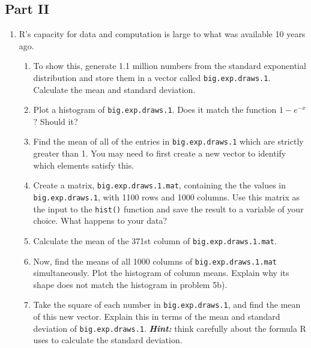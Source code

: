 \documentclass[
]{article}
\providecommand{\tightlist}{%
  \setlength{\itemsep}{0pt}\setlength{\parskip}{0pt}}
\begin{document}
\hypertarget{part-ii}{%
\subsection{Part II}\label{part-ii}}

\begin{enumerate}
\def\labelenumi{\arabic{enumi}.}
\setcounter{enumi}{4}
\tightlist
\item
  R's capacity for data and computation is large to what was available
  10 years ago.

  \begin{enumerate}
  \def\labelenumii{\alph{enumii}.}
  \tightlist
  \item
    To show this, generate 1.1 million numbers from the standard
    exponential distribution and store them in a vector called
    \texttt{big.exp.draws.1}. Calculate the mean and standard deviation.
  \item
    Plot a histogram of \texttt{big.exp.draws.1}. Does it match the
    function \(1-e^{-x}\)? Should it?
  \item
    Find the mean of all of the entries in \texttt{big.exp.draws.1}
    which are strictly greater than 1. You may need to first create a
    new vector to identify which elements satisfy this.
  \item
    Create a matrix, \texttt{big.exp.draws.1.mat}, containing the the
    values in \texttt{big.exp.draws.1}, with 1100 rows and 1000 columns.
    Use this matrix as the input to the \texttt{hist()} function and
    save the result to a variable of your choice. What happens to your
    data?
  \item
    Calculate the mean of the 371st column of
    \texttt{big.exp.draws.1.mat}.
  \item
    Now, find the means of all 1000 columns of
    \texttt{big.exp.draws.1.mat} simultaneously. Plot the histogram of
    column means. Explain why its shape does not match the histogram in
    problem 5b).
  \item
    Take the square of each number in \texttt{big.exp.draws.1}, and find
    the mean of this new vector. Explain this in terms of the mean and
    standard deviation of \texttt{big.exp.draws.1}.
    \textbf{\emph{Hint:}} think carefully about the formula R uses to
    calculate the standard deviation.
  \end{enumerate}
\end{enumerate}
\end{document}
